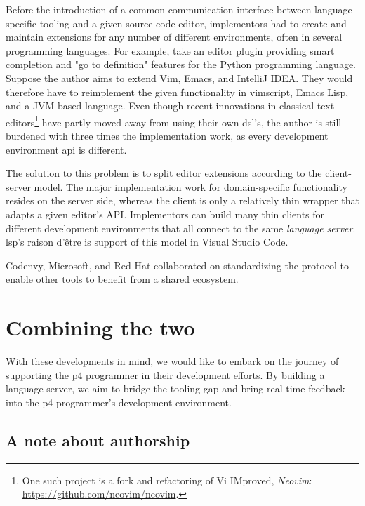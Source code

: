 Before the introduction of a common communication interface between
language-specific tooling and a given source code editor, implementors had to
create and maintain extensions for any number of different environments, often
in several programming languages. For example, take an editor plugin providing
smart completion and "go to definition" features for the Python programming
language. Suppose the author aims to extend Vim, Emacs, and IntelliJ IDEA. They
would therefore have to reimplement the given functionality in vimscript, Emacs
Lisp, and a JVM-based language. Even though recent innovations in classical text
editors\footnote{One such project is a fork and refactoring of Vi IMproved,
\emph{Neovim}: \url{https://github.com/neovim/neovim}.} have partly moved away
from using their own \acrshort{dsl}'s, the author is still burdened with three
times the implementation work, as every development environment \acrshort{api}
is different.

The solution to this problem is to split editor extensions according to the
client-server model. The major implementation work for domain-specific
functionality resides on the server side, whereas the client is only a
relatively thin wrapper that adapts a given editor's API. Implementors can build
many thin clients for different development environments that all connect to the
same \emph{language server}. \acrshort{lsp}'s raison d'être is support of this
model in Visual Studio Code.

Coden\-vy, Microsoft, and Red Hat collaborated on standardizing the protocol to
enable other tools to benefit from a shared
ecosystem\cite{sdtimesCodenvyMicrosoft,infoworldMicrosoftbackedLanguage}.

\section*{Combining the two}

With these developments in mind, we would like to embark on the journey of
supporting the \acrshort{p4} programmer in their development efforts. By
building a language server, we aim to bridge the tooling gap and bring real-time
feedback into the \acrshort{p4} programmer's development environment.

\subsection*{A note about authorship}


